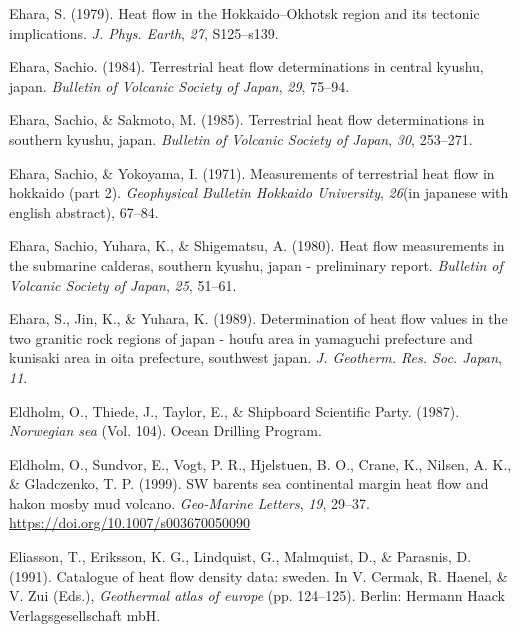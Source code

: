 \documentclass[draft,linenumbers]{agujournal2018}
\begin{document}
\leavevmode{}%
Ehara, S. (1979). Heat flow in the {Hokkaido--Okhotsk} region and its
tectonic implications. \emph{J. Phys. Earth}, \emph{27}, S125--s139.

\leavevmode{}%
Ehara, Sachio. (1984). Terrestrial heat flow determinations in central
kyushu, japan. \emph{Bulletin of Volcanic Society of Japan}, \emph{29},
75--94.

\leavevmode{}%
Ehara, Sachio, \& Sakmoto, M. (1985). Terrestrial heat flow
determinations in southern kyushu, japan. \emph{Bulletin of Volcanic
Society of Japan}, \emph{30}, 253--271.

\leavevmode{}%
Ehara, Sachio, \& Yokoyama, I. (1971). Measurements of terrestrial heat
flow in hokkaido (part 2). \emph{Geophysical Bulletin Hokkaido
University}, \emph{26}(in japanese with english abstract), 67--84.

\leavevmode{}%
Ehara, Sachio, Yuhara, K., \& Shigematsu, A. (1980). Heat flow
measurements in the submarine calderas, southern kyushu, japan -
preliminary report. \emph{Bulletin of Volcanic Society of Japan},
\emph{25}, 51--61.

\leavevmode{}%
Ehara, S., Jin, K., \& Yuhara, K. (1989). Determination of heat flow
values in the two granitic rock regions of japan - houfu area in
yamaguchi prefecture and kunisaki area in oita prefecture, southwest
japan. \emph{J. Geotherm. Res. Soc. Japan}, \emph{11}.

\leavevmode{}%
Eldholm, O., Thiede, J., Taylor, E., \& Shipboard Scientific Party.
(1987). \emph{Norwegian sea} (Vol. 104). Ocean Drilling Program.

\leavevmode{}%
Eldholm, O., Sundvor, E., Vogt, P. R., Hjelstuen, B. O., Crane, K.,
Nilsen, A. K., \& Gladczenko, T. P. (1999). SW barents sea continental
margin heat flow and hakon mosby mud volcano. \emph{Geo-Marine Letters},
\emph{19}, 29--37. \url{https://doi.org/10.1007/s003670050090}

\leavevmode{}%
Eliasson, T., Eriksson, K. G., Lindquist, G., Malmquist, D., \&
Parasnis, D. (1991). Catalogue of heat flow density data: sweden. In V.
Cermak, R. Haenel, \& V. Zui (Eds.), \emph{Geothermal atlas of europe}
(pp. 124--125). Berlin: Hermann Haack Verlagsgesellschaft mbH.
\end{document}
